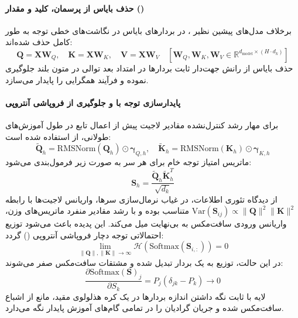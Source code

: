 \paragraph*{حذف بایاس از پرسمان، کلید و مقدار ()}
برخلاف مدل‌های پیشین نظیر  \cite{yang2024qwen2}، در  بردارهای بایاس در نگاشت‌های خطی توجه به طور کامل حذف شده‌اند:
\begin{equation}
    \mathbf{Q} = \mathbf{X} \mathbf{W}_Q, \quad \mathbf{K} = \mathbf{X} \mathbf{W}_K, \quad \mathbf{V} = \mathbf{X} \mathbf{W}_V \quad \left[\mathbf{W}_Q, \mathbf{W}_K, \mathbf{W}_V \in \mathbb{R}^{d_{\text{model}} \times (H \cdot d_k)}\right]
\end{equation}
حذف بایاس از رانش جهت‌دار ثابت بردارها در امتداد بعد توالی در متون بلند جلوگیری نموده و فرآیند همگرایی را پایدار می‌سازد.

\paragraph*{پایدارسازی توجه با  و جلوگیری از فروپاشی آنتروپی}
برای مهار رشد کنترل‌نشده مقادیر لاجیت پیش از اعمال تابع  در طول آموزش‌های طولانی، از  \cite{dehghani2023scaling} استفاده شده است:
\begin{equation}
    \tilde{\mathbf{Q}}_h = \text{RMSNorm}(\mathbf{Q}_h) \odot \boldsymbol{\gamma}_{Q,h}, \quad \tilde{\mathbf{K}}_h = \text{RMSNorm}(\mathbf{K}_h) \odot \boldsymbol{\gamma}_{K,h}
\end{equation}
ماتریس امتیاز توجه خام برای هر سر به صورت زیر فرمول‌بندی می‌شود:
\begin{equation}
    \mathbf{S}_h = \frac{\tilde{\mathbf{Q}}_h \tilde{\mathbf{K}}_h^T}{\sqrt{d_k}}
\end{equation}
از دیدگاه تئوری اطلاعات، در غیاب نرمال‌سازی سرها، واریانس لاجیت‌ها با رابطه $\text{Var}(\mathbf{S}_{ij}) \propto \|\mathbf{Q}\|^2 \|\mathbf{K}\|^2$ متناسب بوده و با رشد مقادیر منفرد ماتریس‌های وزن، واریانس ورودی سافت‌مکس به بی‌نهایت میل می‌کند. این پدیده باعث می‌شود توزیع احتمالاتی توجه دچار فروپاشی آنتروپی () گردد:
\begin{equation}
    \lim_{\|\mathbf{Q}\|, \|\mathbf{K}\| \to \infty} \mathcal{H}\left(\text{Softmax}(\mathbf{S}_{i,:})\right) = 0
\end{equation}
در این حالت، توزیع به یک بردار  تبدیل شده و مشتقات سافت‌مکس صفر می‌شوند:
\begin{equation}
    \frac{\partial \text{Softmax}(\mathbf{S})_j}{\partial S_k} = P_j (\delta_{jk} - P_k) \to 0
\end{equation}
لایه  با ثابت نگه داشتن اندازه بردارها در یک کره هذلولوی مقید، مانع از اشباع سافت‌مکس شده و جریان گرادیان را در تمامی گام‌های آموزش پایدار نگه می‌دارد.

